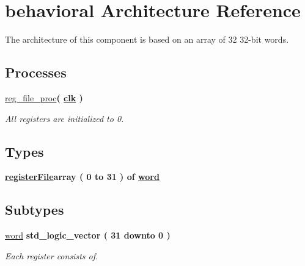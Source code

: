 \hypertarget{classregister__file_1_1behavioral}{\section{behavioral \-Architecture \-Reference}
\label{classregister__file_1_1behavioral}
}


\-The architecture of this component is based on an array of 32 32-\/bit words.  


\*
\*
\subsection*{\-Processes}
 \begin{DoxyCompactItemize}
\item 
\hyperlink{classregister__file_1_1behavioral_a505eecc19921760349f93c27476b8e4c}{reg\-\_\-file\-\_\-proc}{\bfseries  ( {\bfseries {\bfseries \hyperlink{classregister__file_ae5e9fe74cd98136dd9bfe9fe944036a6}{clk}}   } )}
\begin{DoxyCompactList}\small\item\em \-All registers are initialized to 0. \end{DoxyCompactList}\end{DoxyCompactItemize}
\subsection*{\-Types}
 \begin{DoxyCompactItemize}
\item 
{\bfseries \hyperlink{classregister__file_1_1behavioral_a312e330e12c981e3094d8419afb16a58}{register\-File}{\bfseries array (  0    to    31  )  of {\bfseries \hyperlink{classregister__file_1_1behavioral_aa89b68ae067d635d4649946a0420ed19}{word}}  }} 
\end{DoxyCompactItemize}
\subsection*{\-Subtypes}
 \begin{DoxyCompactItemize}
\item 
\hyperlink{classregister__file_1_1behavioral_aa89b68ae067d635d4649946a0420ed19}{word} {\bfseries std\-\_\-logic\-\_\-vector (   31    downto    0  ) } 
\begin{DoxyCompactList}\small\item\em \-Each register consists of. \end{DoxyCompactList}\end{DoxyCompactItemize}
